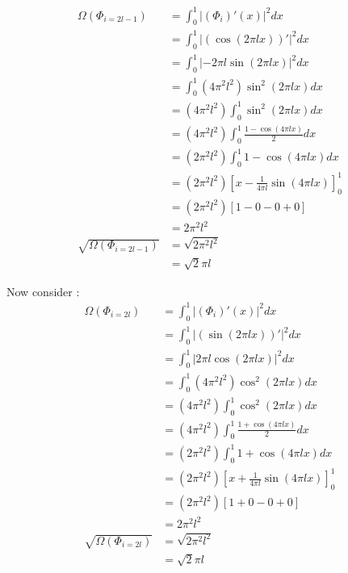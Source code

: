 \documentclass{./tufte-handout}
\begin{document}
\begin{enumerate}[(a)]
\begin{enumerate}
    \begin{align}
        \Omega(\Phi_{i=2l-1}) &= \int_0^1 |(\Phi_i)'(x)|^2 dx \\
            &= \int_0^1 | (\cos(2 \pi l x ))' |^2 dx \\
            &= \int_0^1 | -2 \pi l \sin(2 \pi l x) |^2 dx \\
            &= \int_0^1 (4 \pi^2 l^2) \sin^2(2 \pi l x) dx \\
            &= (4 \pi^2 l^2) \int_0^1  \sin^2(2 \pi l x) dx \\
            &= (4 \pi^2 l^2) \int_0^1  \frac{1 - \cos(4 \pi l x)}{2} dx \\
            &= (2 \pi^2 l^2) \int_0^1  1 - \cos(4 \pi l x) dx \\
            &= (2 \pi^2 l^2) \left[ x - \frac{1}{4 \pi l} \sin(4 \pi l x) \right]_0^1 \\
            &= (2 \pi^2 l^2) \left[ 1 - 0 - 0 + 0 \right] \\
            &= 2 \pi^2 l^2\\
        \sqrt{\Omega(\Phi_{i=2l-1})} &= \sqrt{2 \pi^2 l^2} \\
            &= \sqrt{2} \pi l
    \end{align}

    Now consider : 
    \begin{align}
        \Omega(\Phi_{i=2l}) &= \int_0^1 |(\Phi_i)'(x)|^2 dx \\
            &= \int_0^1 | (\sin(2 \pi l x ))' |^2 dx \\
            &= \int_0^1 | 2 \pi l \cos(2 \pi l x) |^2 dx \\
            &= \int_0^1 (4 \pi^2 l^2) \cos^2(2 \pi l x) dx \\
            &= (4 \pi^2 l^2) \int_0^1  \cos^2(2 \pi l x) dx \\
            &= (4 \pi^2 l^2) \int_0^1  \frac{1 + \cos(4 \pi l x)}{2} dx \\
            &= (2 \pi^2 l^2) \int_0^1  1 + \cos(4 \pi l x) dx \\
            &= (2 \pi^2 l^2) \left[ x + \frac{1}{4 \pi l} \sin(4 \pi l x) \right]_0^1 \\
            &= (2 \pi^2 l^2) \left[ 1 + 0 - 0 + 0 \right] \\
            &= 2 \pi^2 l^2\\
        \sqrt{\Omega(\Phi_{i=2l})} &= \sqrt{2 \pi^2 l^2} \\
            &= \sqrt{2} \pi l
    \end{align} 


\end{enumerate}
\end{enumerate}
\end{document}
